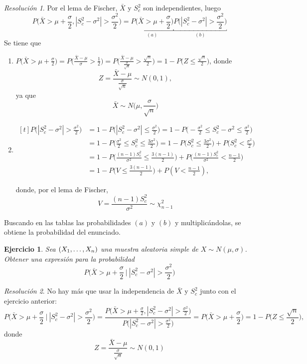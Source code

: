 \documentclass[11pt]{report}
\newtheorem{exercise}{Ejercicio}
\theoremstyle{remark}
\newtheorem*{resolution}{Resolución}
\begin{document}
\begin{resolution}
Por el lema de Fischer, $\bar{X}$ y $S^2_c$ son independientes, luego
\[P\bigl(\bar{X}>\mu+\frac{\sigma}{2},|S^2_c-\sigma^2|> \frac{\sigma^2}{2}\bigr) = \underbracket{P\bigl(\bar{X}>\mu+\frac{\sigma}{2}\bigr)}_{(a)}\underbracket{P\bigl(|S^2_c-\sigma^2|> \frac{\sigma^2}{2}\bigr)}_{(b)}\]
Se tiene que
\begin{enumerate}
    \item $\displaystyle P\bigl(\bar{X}>\mu+\frac{\sigma}{2}\bigr) = P\bigr(\frac{\bar{X}-\mu}{\sigma}>\frac{1}{2}\bigl) = P\bigr(\frac{\bar{X}-\mu}{\frac{\sigma}{\sqrt{n}}}>\frac{\sqrt{n}}{2}\bigl) = 1-P\bigl(Z \leq \frac{\sqrt{n}}{2}\bigr)$, donde
    \[Z = \frac{\bar{X}-\mu}{\frac{\sigma}{\sqrt{n}}} \sim N(0,1),\]
    ya que
    \[\bar{X} \sim N\bigl(\mu,\frac{\sigma}{\sqrt{n}}\bigr)\]
    \item $\displaystyle \begin{aligned}[t]
        P\bigl(|S^2_c-\sigma^2|> \frac{\sigma^2}{2}\bigr) &= 1-P\bigl(|S^2_c-\sigma^2|\leq \frac{\sigma^2}{2}\bigr) = 1-P\bigl(-\frac{\sigma^2}{2} \leq S^2_c-\sigma^2 \leq \frac{\sigma^2}{2}\bigr) \\ &= 1-P\bigl(\frac{\sigma^2}{2} \leq S^2_c \leq \frac{3\sigma^2}{2}\bigr)
        = 1-P\bigl(S^2_c\leq \frac{3\sigma^2}{2}\bigr) + P\bigl(S^2_c < \frac{\sigma^2}{2}\bigr) \\
        &= 1-P\bigl(\frac{(n-1)S^2_c}{\sigma^2} \leq \frac{3(n-1)}{2}\bigr) + P\bigl(\frac{(n-1)S^2_c}{\sigma^2} < \frac{n-1}{2}\bigr) \\
        &= 1-P\bigl(V \leq \frac{3(n-1)}{2}\bigr)+P(V<\frac{n-1}{2}),
    \end{aligned}$
    
    donde, por el lema de Fischer,
    \[V = \frac{(n-1)S^2_c}{\sigma^2} \sim \chi^2_{n-1}\]
\end{enumerate}
Buscando en las tablas las probabilidades $(a)$ y $(b)$ y multiplicándolas, se obtiene la probabilidad del enunciado.
\end{resolution}

\begin{exercise}
Sea $(X_1,\mathellipsis,X_n)$ una muestra aleatoria simple de $X \sim N(\mu,\sigma)$. Obtener una expresión para la probabilidad
\[P\bigl(\bar{X}>\mu+\frac{\sigma}{2} \ \biggl| \ |S^2_c-\sigma^2|> \frac{\sigma^2}{2}\bigr)\]
\end{exercise}

\begin{resolution}
No hay más que usar la independencia de $\bar{X}$ y $S^2_c$ junto con el ejercicio anterior:
\[P\bigl(\bar{X}>\mu+\frac{\sigma}{2} \ \biggl| \ |S^2_c-\sigma^2|> \frac{\sigma^2}{2}\bigr) = \frac{P\bigl(\bar{X}>\mu+\frac{\sigma}{2},|S^2_c-\sigma^2|> \frac{\sigma^2}{2}\bigr)}{P\bigl(|S_c^2-\sigma^2|> \frac{\sigma^2}{2}\bigr)} = P\bigl(\bar{X}>\mu+\frac{\sigma}{2}\bigr) = 1-P\bigl(Z \leq \frac{\sqrt{n}}{2}\bigr),\]
donde
\[Z = \frac{\bar{X}-\mu}{\frac{\sigma}{\sqrt{n}}} \sim N(0,1)\]

\end{resolution}
\end{document}
